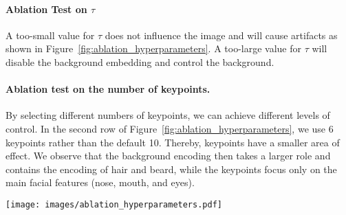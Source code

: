 \documentclass[10pt, conference, compsocconf]{IEEEtran}
\begin{document}
\paragraph{Ablation Test on $\tau$}
A too-small value for $\tau$ does not influence the image and will cause artifacts as shown in Figure~\ref{fig:ablation_hyperparameters}. A too-large value for $\tau$ will disable the background embedding and control the background.

\begin{table*}
\begin{center}
\end{center}
\caption{\textbf{Quantitative ablation test on dimension of embeddings.} For both metrics, the lower means better.}
\label{tab:ablation_n_embedding}
\end{table*}

\paragraph{Ablation test on the number of keypoints.} By selecting different numbers of keypoints, we can achieve different levels of control. In the second row of Figure~\ref{fig:ablation_hyperparameters}, we use 6 keypoints rather than the default 10. Thereby, keypoints have a smaller area of effect. We observe that the background encoding then takes a larger role and contains the encoding of hair and beard, while the keypoints focus only on the main facial features (nose, mouth, and eyes).

\begin{figure*}[t]
\begin{center}
   \texttt{[image: images/ablation\_hyperparameters.pdf]}
\end{center}
   \caption{\textbf{Ablation study on hyperparameters}. (Left) Face generation with on FFHQ with $\tau=0.002$. We use the red circle to mark the artifacts in the images. (Right) Face generation on FFHQ with number of keypoints 10 (top) and 6 (bottom). More keypoints lead to a stronger influence of the keypoint embedding. However, the 6-keypoint version still provides control, e.g., glasses, nose type, and pose. From left to right: original image, replaced background (difference map overlayed), replaced keypoint embeddings (target image overlayed), exchanged eye embeddings, and keypoint position exchanged.}
\label{fig:ablation_hyperparameters}
\end{figure*}
\end{document}
